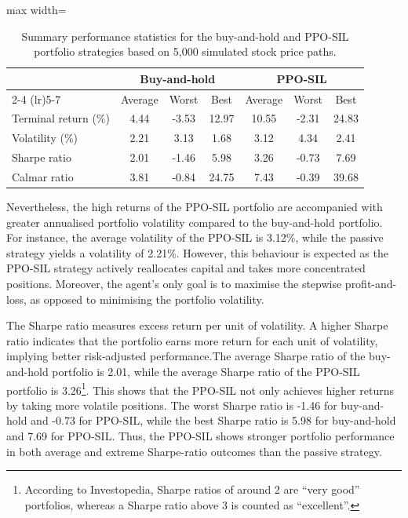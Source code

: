 \begin{table}[!htbp]
    \centering
    \small
    \setlength{\tabcolsep}{5pt}
    \renewcommand{\arraystretch}{0.95}

    \begin{adjustbox}{max width=\textwidth}
    \begin{tabular}{@{}lccc ccc@{}}
        \toprule
        & \multicolumn{3}{c}{Buy-and-hold}
        & \multicolumn{3}{c}{PPO-SIL} \\
        \cmidrule(lr){2-4}
        \cmidrule(lr){5-7}
        & Average & Worst & Best
        & Average & Worst & Best \\
        \midrule
        Terminal return (\%) & 4.44 & -3.53 & 12.97 & 10.55 & -2.31 & 24.83 \\
        Volatility (\%)      & 2.21 & 3.13  & 1.68  & 3.12  & 4.34  & 2.41 \\
        Sharpe ratio         & 2.01 & -1.46 & 5.98  & 3.26  & -0.73 & 7.69 \\
        Calmar ratio         & 3.81 & -0.84 & 24.75 & 7.43  & -0.39 & 39.68 \\
        \bottomrule
    \end{tabular}
    \end{adjustbox}

    \caption{Summary performance statistics for the buy-and-hold and PPO-SIL portfolio strategies based on 5,000 simulated stock price paths.}
    \label{tab: portfolio performance summary}
\end{table}

Nevertheless, the high returns of the PPO-SIL portfolio are accompanied with greater annualised portfolio volatility compared to the buy-and-hold portfolio. For instance, the average volatility of the PPO-SIL is 3.12\%, while the passive strategy yields a volatility of 2.21\%. However, this behaviour is expected as the PPO-SIL strategy actively reallocates capital and takes more concentrated positions. Moreover, the agent's only goal is to maximise the stepwise profit-and-loss, as opposed to minimising the portfolio volatility. 

The Sharpe ratio measures excess return per unit of volatility. A higher Sharpe ratio indicates that the portfolio earns more return for each unit of volatility, implying better risk‑adjusted performance.The average Sharpe ratio of the buy-and-hold portfolio is 2.01, while the average Sharpe ratio of the PPO-SIL portfolio is 3.26\footnote{According to Investopedia, Sharpe ratios of around 2 are ``very good'' portfolios, whereas a Sharpe ratio above 3 is counted as ``excellent''.}. This shows that the PPO-SIL not only achieves higher returns by taking more volatile positions. The worst Sharpe ratio is -1.46 for buy-and-hold and -0.73 for PPO-SIL, while the best Sharpe ratio is 5.98 for buy-and-hold and 7.69 for PPO-SIL. Thus, the PPO-SIL shows stronger portfolio performance in both average and extreme Sharpe-ratio outcomes than the passive strategy. 

